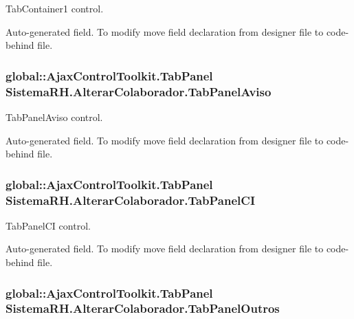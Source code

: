 TabContainer1 control. 

Auto-\/generated field. To modify move field declaration from designer file to code-\/behind file. \hypertarget{class_sistema_r_h_1_1_alterar_colaborador_a10569e565185ae6cdf1f2fec1e01543c}{
\subsubsection[{TabPanelAviso}]{\setlength{\rightskip}{0pt plus 5cm}global::AjaxControlToolkit.TabPanel {\bf SistemaRH.AlterarColaborador.TabPanelAviso}}}
\label{class_sistema_r_h_1_1_alterar_colaborador_a10569e565185ae6cdf1f2fec1e01543c}


TabPanelAviso control. 

Auto-\/generated field. To modify move field declaration from designer file to code-\/behind file. \hypertarget{class_sistema_r_h_1_1_alterar_colaborador_a77e05ab4139ee48a66b390e75c34a566}{
\subsubsection[{TabPanelCI}]{\setlength{\rightskip}{0pt plus 5cm}global::AjaxControlToolkit.TabPanel {\bf SistemaRH.AlterarColaborador.TabPanelCI}}}
\label{class_sistema_r_h_1_1_alterar_colaborador_a77e05ab4139ee48a66b390e75c34a566}


TabPanelCI control. 

Auto-\/generated field. To modify move field declaration from designer file to code-\/behind file. \hypertarget{class_sistema_r_h_1_1_alterar_colaborador_a90b9b577c4fdc83f57c8692edb554b8d}{
\subsubsection[{TabPanelOutros}]{\setlength{\rightskip}{0pt plus 5cm}global::AjaxControlToolkit.TabPanel {\bf SistemaRH.AlterarColaborador.TabPanelOutros}}}
\label{class_sistema_r_h_1_1_alterar_colaborador_a90b9b577c4fdc83f57c8692edb554b8d}


